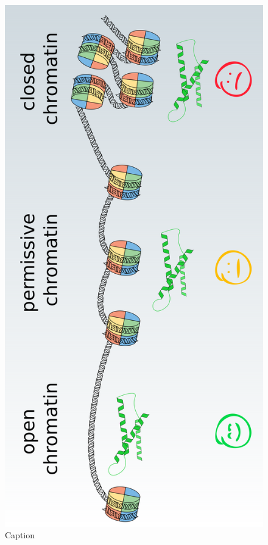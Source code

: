 \begin{figure}[hbtp]
    \includegraphics[height=0.9\textheight]{ch1.Introduction/imgs/accessibility.png}
    \caption{Caption}
    \label{fig:accessibility}
\end{figure}



